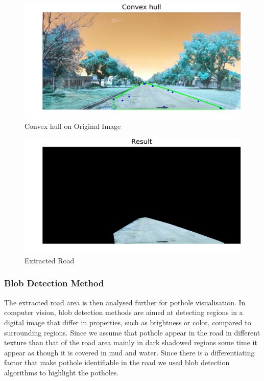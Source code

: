 \documentclass[journal]{IEEEtran}
\begin{document}
\begin{figure}[!htb]
\begin{center}
\includegraphics[scale=1]{Images/6_Convex_hull.png}
\end{center}
\caption{Convex hull on Original Image}
\end{figure}
\newpage

\begin{figure}[!htb]
\begin{center}
\includegraphics[scale=0.65]{Images/7_Result.png}
\end{center}
\caption{Extracted Road}
\end{figure}



\vspace*{.5cm}


\subsubsection*{Blob Detection Method}

The extracted road area is then analysed further for pothole visualisation. In computer vision, blob detection methods are aimed at detecting regions in a digital image that differ in properties, such as brightness or color, compared to surrounding regions. Since we assume that pothole appear in the road in different texture than that of the road area mainly in dark shadowed regions some time it appear as though it is covered in mud and water. Since there is a differentiating factor that make pothole identifiable in the road we used blob detection algorithms to highlight the potholes.
\end{document}
